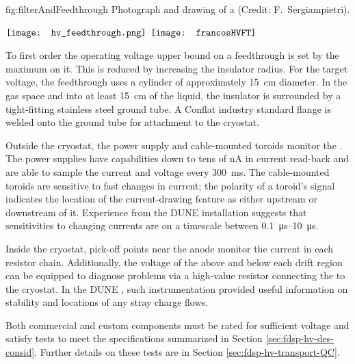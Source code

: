 \begin{dunefigure}{fig:filterAndFeedthrough}
{  Photograph and drawing of a  \fdth (Credit:  F.~Sergiampietri).}
\begin{minipage}{\textwidth}%
  \centering
 $\vcenter{\hbox{\texttt{[image: hv\_feedthrough.png]}}}$
 \hspace*{0.001\textwidth}  $\vcenter{\hbox{\texttt{[image: francosHVFT]}}}$
\end{minipage}
\end{dunefigure}

To first order the operating voltage upper bound on a feedthrough is set by the maximum \efield{} on it. %
This \efield{} is reduced by increasing the insulator radius.  For the target voltage, the feedthrough uses a  cylinder of approximately \SI{15}{cm} diameter.  In the gas space and into at least \SI{15}{\centi\meter} of the liquid, the insulator is surrounded by a tight-fitting stainless steel ground tube.  A %
Conflat industry standard flange is welded onto the ground tube for attachment to the cryostat.

Outside the cryostat, the  power supply and cable-mounted toroids monitor the .    The power supplies 
have capabilities down to tens of \si{\nano\ampere} in current read-back 
and are able to sample the current and voltage every \SI{300}{\ms}.  The cable-mounted toroids are sensitive to fast changes in current;  
the polarity of a toroid's signal  
indicates the location of the current-drawing feature as either upstream or downstream of it.  Experience from the DUNE  installation suggests that sensitivities to changing currents %
are on a timescale between \SIrange{0.1}{10}{\micro\s}.

Inside the cryostat, pick-off points near the anode monitor the current  
in each resistor chain.  Additionally, the voltage of the  above and below each drift region can be equipped to diagnose problems via a high-value resistor connecting the  to the cryostat.  In the DUNE , such instrumentation provided useful information on  stability and locations of %
any stray charge flows. %

Both commercial and custom  components must be rated for sufficient voltage and satisfy tests to meet the specifications %
summarized in Section \ref{sec:fdsp-hv-des-consid}.  Further details on these tests are in Section \ref{sec:fdsp-hv-transport-QC}.

